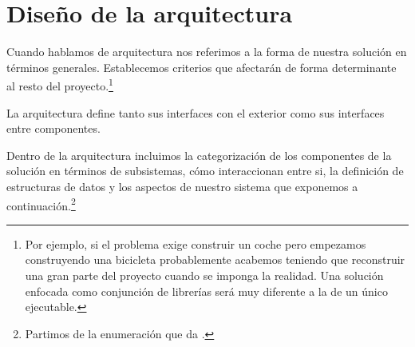 \section{Diseño de la arquitectura}

Cuando hablamos de arquitectura nos referimos a la forma de nuestra solución en términos generales.
Establecemos criterios que afectarán de forma determinante al resto del proyecto.\footnote{
    Por ejemplo, si el problema exige construir un coche pero empezamos construyendo una bicicleta probablemente acabemos
    teniendo que reconstruir una gran parte del proyecto cuando se imponga la realidad.
    Una solución enfocada como conjunción de librerías será muy diferente a la de un único ejecutable.
}

La arquitectura define tanto sus interfaces con el exterior como sus interfaces entre componentes.

Dentro de la arquitectura incluimos la categorización de los componentes de la solución en términos
de subsistemas, cómo interaccionan entre si, la definición de estructuras de datos y los aspectos
de nuestro sistema que exponemos a continuación.\footnote{Partimos de la enumeración que da
\cite[Architecture Prerequisite]{CodeComplete2}.}


